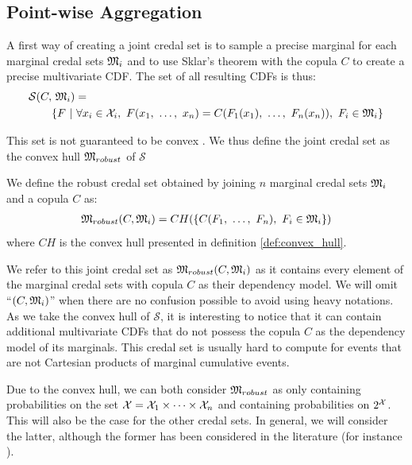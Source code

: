 \subsection{Point-wise Aggregation}\label{sec:robust_method}
A first way of creating a joint credal set is to sample a precise marginal for each marginal credal sets $\mathfrak{M}_i$ and to use Sklar's theorem with the copula $C$ to create a precise multivariate CDF. The set of all resulting CDFs is thus:
\begin{align}\label{eq:robust_ancestor}
    \mathcal{S}(C,& ~\mathfrak{M}_i) = \\
    &\{F~|~\forall x_i \in \mathcal{X}_i,~ F(x_1 , ~\dots, ~ x_n) = C(F_1(x_1) , ~\dots, ~ F_n(x_n)),~F_i\in\mathfrak{M}_i \}
\end{align}

This set is not guaranteed to be convex \cite{schmelzer_random_2023}. We thus define the joint credal set as the convex hull $\mathfrak{M}_{robust}$ of $\mathcal{S}$

\begin{definition}\label{def:robust_credal_set}
    We define the robust credal set obtained by joining $n$ marginal credal sets $\mathfrak{M}_i$ and a copula $C$ as:
    \begin{eqnarray}\label{eq:robust_set}
        \mathfrak{M}_{robust}(C,\mathfrak{M}_i) = CH(\{C(F_1 , ~\dots, ~ F_n),~F_i\in\mathfrak{M}_i \})
    \end{eqnarray}
    where $CH$ is the convex hull presented in definition \ref{def:convex_hull}.
\end{definition}

We refer to this joint credal set as $\mathfrak{M}_{robust}(C,\mathfrak{M}_i)$ as it contains every element of the marginal credal sets with copula $C$ as their dependency model. We will omit ``$(C,\mathfrak{M}_i)$'' when there are no confusion possible to avoid using heavy notations. As we take the convex hull of $\mathcal{S}$, it is interesting to notice that it can contain additional multivariate CDFs that do not possess the copula $C$ as the dependency model of its marginals. This credal set is usually hard to compute for events that are not Cartesian products of marginal cumulative events.

\begin{remark}
    Due to the convex hull, we can both consider $\mathfrak{M}_{robust}$ as only containing probabilities on the set $\mathcal{X}=\mathcal{X}_1\times\dots\times\mathcal{X}_n$ and containing probabilities on $2^{\mathcal{X}}$. This will also be the case for the other credal sets. In general, we will consider the latter, although the former has been considered in the literature (for instance \cite{schmelzer_characterizing_2012, schmelzer_random_2023}).
\end{remark}

